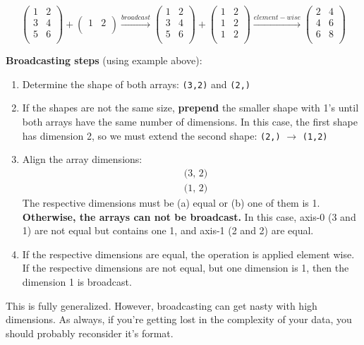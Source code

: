 \documentclass[12pt]{article}
\numberwithin{equation}{section}
\begin{document}
\begin{equation*}
    \begin{pmatrix}
        1 & 2\\
        3 & 4\\
        5 & 6\\
    \end{pmatrix}
    +
    \begin{pmatrix}
        1 & 2\\
    \end{pmatrix}
    \xrightarrow{broadcast }
    \begin{pmatrix}
        1 & 2\\
        3 & 4\\
        5 & 6\\
    \end{pmatrix}
    +
    \begin{pmatrix}
        1 & 2\\
        1 & 2\\
        1 & 2\\
    \end{pmatrix}
    \xrightarrow{element-wise }
	\begin{pmatrix}
		2 & 4\\
		4 & 6\\
		6 & 8\\
	\end{pmatrix}
\end{equation*}

\textbf{Broadcasting steps} (using example above):
\begin{enumerate}
    \item Determine the shape of both arrays: \verb|(3,2)| and \verb|(2,)|
    \item If the shapes are not the same size, \textbf{prepend} the smaller shape with 1's until both arrays have the same number of dimensions. In this case, the first shape has dimension 2, so we must extend the second shape: \verb|(2,)| $\rightarrow$ \verb|(1,2)|
    \item Align the array dimensions:
    \begin{align*}
        &\text{(3, 2)}\\
        &\text{(1, 2)}
    \end{align*}
    The respective dimensions must be (a) equal or (b) one of them is 1. \textbf{Otherwise, the arrays can not be broadcast.} In this case, axis-0 (3 and 1) are not equal but contains one 1, and axis-1 (2 and 2) are equal.
    \item If the respective dimensions are equal, the operation is applied element wise. If the respective dimensions are not equal, but one dimension is 1, then the dimension 1 is broadcast.
\end{enumerate}

   This is fully generalized. However, broadcasting can get nasty with high dimensions. As always, if you're getting lost in the complexity of your data, you should probably reconsider it's format. 
\end{document}

